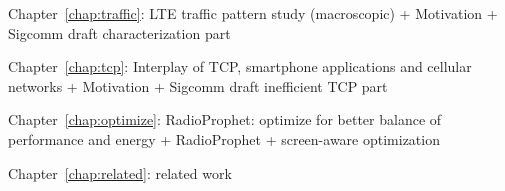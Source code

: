 Chapter~\ref{chap:traffic}: LTE traffic pattern study (macroscopic)
	+ Motivation
	+ Sigcomm draft characterization part

Chapter~\ref{chap:tcp}: Interplay of TCP, smartphone applications and cellular networks
	+ Motivation
	+ Sigcomm draft inefficient TCP part
		
Chapter~\ref{chap:optimize}: RadioProphet: optimize for better balance of performance and energy
	+ RadioProphet
	+ screen-aware optimization
	
Chapter~\ref{chap:related}: related work
